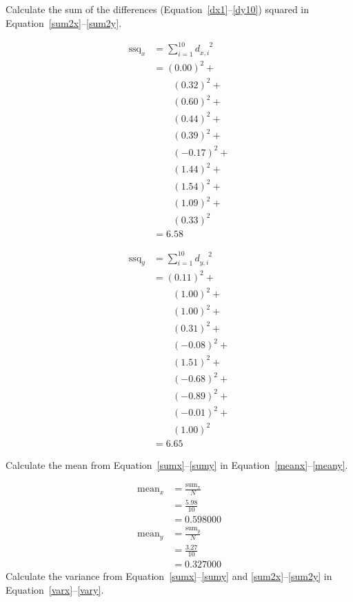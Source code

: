 \documentclass[twocolumn]{article}
\begin{document}
Calculate the sum of the differences (Equation~\ref{dx1}--\ref{dy10}) squared in Equation~\ref{sum2x}--\ref{sum2y}.

\begin{align}
\text{ssq}_{x} &= \sum_{i=1}^{10} d_{x,i}^{\phantom{x,i}2} \nonumber\\
 &= (0.00)^2 + \nonumber\\
 &\quad\quad (0.32)^2 + \nonumber\\
 &\quad\quad (0.60)^2 + \nonumber\\
 &\quad\quad (0.44)^2 + \nonumber\\
 &\quad\quad (0.39)^2 + \nonumber\\
 &\quad\quad (-0.17)^2 + \nonumber\\
 &\quad\quad (1.44)^2 + \nonumber\\
 &\quad\quad (1.54)^2 + \nonumber\\
 &\quad\quad (1.09)^2 + \nonumber\\
 &\quad\quad (0.33)^2 \nonumber\\
 &= 6.58 \label{sum2x}
\end{align}

\begin{align}
\text{ssq}_{y} &= \sum_{i=1}^{10} d_{y,i}^{\phantom{y,i}2} \nonumber\\
 &= (0.11)^2 + \nonumber\\
 &\quad\quad (1.00)^2 + \nonumber\\
 &\quad\quad (1.00)^2 + \nonumber\\
 &\quad\quad (0.31)^2 + \nonumber\\
 &\quad\quad (-0.08)^2 + \nonumber\\
 &\quad\quad (1.51)^2 + \nonumber\\
 &\quad\quad (-0.68)^2 + \nonumber\\
 &\quad\quad (-0.89)^2 + \nonumber\\
 &\quad\quad (-0.01)^2 + \nonumber\\
 &\quad\quad (1.00)^2 \nonumber\\
 &= 6.65 \label{sum2y}
\end{align}

Calculate the mean from Equation~\ref{sumx}--\ref{sumy} in Equation~\ref{meanx}--\ref{meany}.

\begin{align}
\text{mean}_{x} &= \frac{\text{sum}_{x}}{N} \nonumber\\
 &= \frac{5.98}{10} \nonumber\\
 &= 0.598000 \label{meanx}\\
\text{mean}_{y} &= \frac{\text{sum}_{y}}{N} \nonumber\\
 &= \frac{3.27}{10} \nonumber\\
 &= 0.327000 \label{meany}
\end{align}
Calculate the variance from Equation~\ref{sumx}--\ref{sumy} and \ref{sum2x}--\ref{sum2y} in Equation~\ref{varx}--\ref{vary}.
\end{document}

